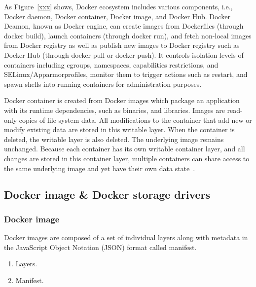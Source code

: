 
As Figure~\ref{xxx} shows, Docker ecosystem includes various components, i.e., Docker daemon, Docker container, Docker image, and Docker Hub. Docker Deamon, known as Docker engine, can create images from Dockerfiles (through docker build), launch containers (through docker run), and fetch non-local images from Docker registry as well as publish new images to Docker registry such as Docker Hub (through docker pull or docker push). It controls isolation levels of containers including cgroups, namespaces, capabilities restrictions, and SELinux/Apparmorprofiles, monitor them to trigger actions such as restart, and spawn shells into running containers for administration purposes. 

Docker container is created from Docker images which package an application with its runtime dependencies, such as binaries, and libraries. Images are read-only copies of file system data. All modifications to the container that add new or modify existing data are stored in this writable layer. When the container is deleted, the writable layer is also deleted. The underlying image remains unchanged. Because each container has its own writable container layer, and all changes are stored in this container layer, multiple containers can share access to the same underlying image and yet have their own data state~\cite{}.  
 
\subsection{Docker image \& Docker storage drivers}

\subsubsection{Docker image}


Docker images are composed of a set of individual layers along with metadata in the JavaScript Object Notation (JSON) format called manifest. 


\begin{enumerate}
	\item Layers.
	\item Manifest.
\end{enumerate}

